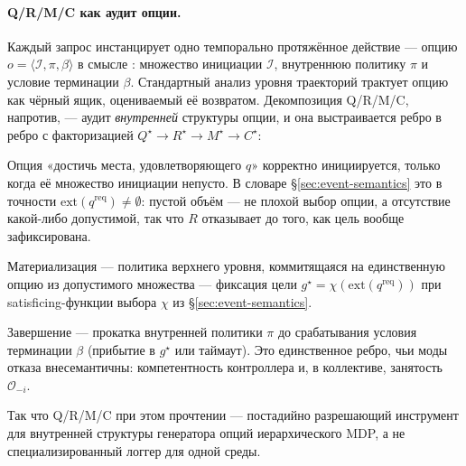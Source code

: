 \documentclass{article}
\begin{document}
\paragraph{Q/R/M/C как аудит опции.}
Каждый запрос инстанцирует одно темпорально протяжённое действие --- опцию
$o=\langle \mathcal{I},\pi,\beta\rangle$ в смысле
\citet{sutton1999between}: множество инициации $\mathcal{I}$, внутреннюю
политику $\pi$ и условие терминации $\beta$. Стандартный
анализ уровня траекторий трактует опцию как чёрный ящик, оцениваемый её
возвратом. Декомпозиция Q/R/M/C, напротив, --- аудит \emph{внутренней}
структуры опции, и она выстраивается ребро в ребро с
факторизацией $Q^\star\!\rightarrow\!R^\star\!\rightarrow\!M^\star\!\rightarrow\!C^\star$:
\begin{description}[leftmargin=14pt,topsep=2pt,itemsep=2pt]
\item[$Q^\star\!\rightarrow\!R^\star$ (инициация).] Опция «достичь места, удовлетворяющего $q$» корректно инициируется, только когда её множество инициации непусто. В словаре \S\ref{sec:event-semantics} это в точности $\mathrm{ext}(q^{\mathrm{req}})\neq\emptyset$: пустой объём --- не плохой выбор опции, а отсутствие какой-либо допустимой, так что $R$ отказывает до того, как цель вообще зафиксирована.
\item[$R^\star\!\rightarrow\!M^\star$ (политика над опциями).] Материализация --- политика верхнего уровня, коммитящаяся на единственную опцию из допустимого множества --- фиксация цели $g^\star=\chi(\mathrm{ext}(q^{\mathrm{req}}))$ при satisficing-функции выбора $\chi$ из \S\ref{sec:event-semantics}.
\item[$M^\star\!\rightarrow\!C^\star$ (исполнение до терминации).] Завершение --- прокатка внутренней политики $\pi$ до срабатывания условия терминации $\beta$ (прибытие в $g^\star$ или таймаут). Это единственное ребро, чьи моды отказа внесемантичны: компетентность контроллера и, в коллективе, занятость $\mathcal{O}_{-i}$.
\end{description}
Так что Q/R/M/C при этом прочтении --- постадийно разрешающий инструмент для
внутренней структуры генератора опций иерархического MDP, а не
специализированный логгер для одной среды.
\end{document}
